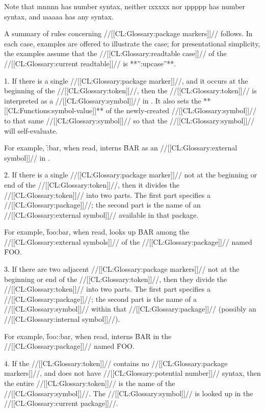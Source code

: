 {Note that \i{nnnnn} has number syntax,
          neither \i{xxxxx} nor \i{ppppp} has number syntax,
      and \i{aaaaa} has any syntax.

A summary of rules concerning //[[CL:Glossary:package markers]]// follows. In each case, examples are offered to illustrate the case; for presentational simplicity, the examples assume that the //[[CL:Glossary:readtable case]]// of the //[[CL:Glossary:current readtable]]// is **'':upcase''**.

\beginlist                                            \item{1.} If there is a single //[[CL:Glossary:package marker]]//, and it occurs at the beginning of the //[[CL:Glossary:token]]//, then the //[[CL:Glossary:token]]// is interpreted as a //[[CL:Glossary:symbol]]// in . It also sets the **[[CL:Functions:symbol-value]]** of the newly-created //[[CL:Glossary:symbol]]// to that same //[[CL:Glossary:symbol]]// so that the //[[CL:Glossary:symbol]]// will self-evaluate.

For example,  \f{:bar}, when read, interns \f{BAR} as an //[[CL:Glossary:external symbol]]// in .

\item{2.} If there is a single //[[CL:Glossary:package marker]]// not at the beginning or end of the //[[CL:Glossary:token]]//, then it divides the //[[CL:Glossary:token]]// into two parts.  The first part specifies a //[[CL:Glossary:package]]//;  the second part is the name of an //[[CL:Glossary:external symbol]]// available in that package.  

For example,  \f{foo:bar}, when read, looks up \f{BAR} among the //[[CL:Glossary:external symbols]]// of the //[[CL:Glossary:package]]// named \f{FOO}.

\item{3.} If there are two adjacent //[[CL:Glossary:package markers]]// not at the beginning or end of the //[[CL:Glossary:token]]//, then they divide the //[[CL:Glossary:token]]// into two parts.  The first part specifies a //[[CL:Glossary:package]]//; the second part is the name of a //[[CL:Glossary:symbol]]// within that //[[CL:Glossary:package]]// (possibly an //[[CL:Glossary:internal symbol]]//).

For example,  \f{foo::bar}, when read, interns \f{BAR} in the //[[CL:Glossary:package]]// named \f{FOO}.

\item{4.} If the //[[CL:Glossary:token]]// contains no //[[CL:Glossary:package markers]]//,  and does not have //[[CL:Glossary:potential number]]// syntax, then the entire //[[CL:Glossary:token]]// is the name of the //[[CL:Glossary:symbol]]//. The //[[CL:Glossary:symbol]]// is looked up in the //[[CL:Glossary:current package]]//.

}
